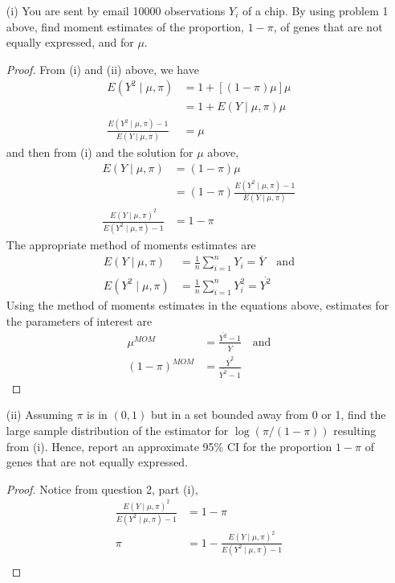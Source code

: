 \documentclass[letterpaper, 12pt]{article}
\newcommand{\sbs}{\;|\;} %
\newcommand{\sion}{\sum_{i=1}^n}
\begin{document}
\begin{enumerate}
\begin{enumerate}
\item[(i)]
You are sent by email 10000 observations $Y_i$ of a chip.
By using problem 1 above, find moment estimates of the proportion, $1-\pi$, of genes that are not equally expressed, and for $\mu$.
\begin{proof}
From (i) and (ii) above, we have 
\begin{align*}
E(Y^2 \sbs \mu, \pi) &= 1+ [(1 - \pi)\mu]\mu
\\
&= 1 + E(Y \sbs \mu, \pi)\mu \\
\frac{E(Y^2 \sbs \mu, \pi) - 1}{E(Y \sbs \mu, \pi)} &= \mu
\end{align*}
and then from (i) and the solution for $\mu$ above, 
\begin{align*}
E(Y \sbs \mu, \pi) &= (1-\pi)\mu
\\
&= (1 - \pi) 
\frac{E(Y^2 \sbs \mu, \pi) - 1}{E(Y \sbs \mu, \pi)} \\
\frac{E(Y \sbs \mu, \pi)^2}{E(Y^2 \sbs \mu, \pi) - 1} 
&= 1- \pi
\end{align*}
The appropriate method of moments estimates are
\begin{align*}
E(Y \mid \mu, \pi) &= \frac{1}{n}\sion Y_i = \overline{Y}
\quad
\text{and}
\\
E(Y^2 \mid \mu, \pi) &= \frac{1}{n} \sion Y_i^2 = \overline{Y^2}
\end{align*}
Using the method of moments estimates in the equations above, estimates for the parameters of interest are
\begin{align*}
\mu^{MOM} &= \frac{\overline{Y^2} - 1}{\overline{Y}}
\quad
\text{and}
\\
(1-\pi)^{MOM} &= \frac{\overline{Y}^2}{\overline{Y^2}-1}
\end{align*}
\end{proof}
\item[(ii)]
Assuming $\pi$ is in $(0,1)$ but in a set bounded away from 0 or 1, find the large sample distribution of the estimator for $\log(\pi/(1 - \pi))$ resulting from (i). Hence, report an approximate 95\% CI for the proportion $1-\pi$ of genes that are not equally expressed.
\begin{proof}
Notice from question 2, part (i),
\begin{align*}
\frac{E(Y \sbs \mu, \pi)^2}{E(Y^2 \sbs \mu, \pi) - 1} 
&= 1- \pi \\
\pi &= 1 - \frac{E(Y \sbs \mu, \pi)^2}{E(Y^2 \sbs \mu, \pi) - 1} 
\\

\end{align*}
\end{proof}
\end{enumerate}
\end{enumerate}
\end{document}
